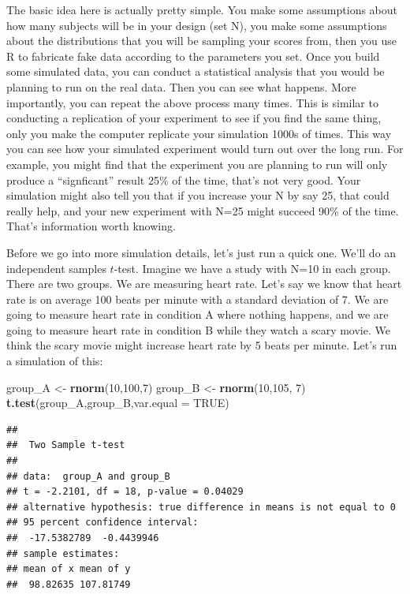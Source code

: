 \documentclass[
]{book}
\newenvironment{Shaded}{\begin{snugshade}}{\end{snugshade}}
\newcommand{\DataTypeTok}[1]{\textcolor[rgb]{0.13,0.29,0.53}{#1}}
\newcommand{\DecValTok}[1]{\textcolor[rgb]{0.00,0.00,0.81}{#1}}
\newcommand{\KeywordTok}[1]{\textcolor[rgb]{0.13,0.29,0.53}{\textbf{#1}}}
\newcommand{\NormalTok}[1]{#1}
\newcommand{\OtherTok}[1]{\textcolor[rgb]{0.56,0.35,0.01}{#1}}
\newcommand{\StringTok}[1]{\textcolor[rgb]{0.31,0.60,0.02}{#1}}
\begin{document}
The basic idea here is actually pretty simple. You make some assumptions about how many subjects will be in your design (set N), you make some assumptions about the distributions that you will be sampling your scores from, then you use R to fabricate fake data according to the parameters you set. Once you build some simulated data, you can conduct a statistical analysis that you would be planning to run on the real data. Then you can see what happens. More importantly, you can repeat the above process many times. This is similar to conducting a replication of your experiment to see if you find the same thing, only you make the computer replicate your simulation 1000s of times. This way you can see how your simulated experiment would turn out over the long run. For example, you might find that the experiment you are planning to run will only produce a ``signficant'' result 25\% of the time, that's not very good. Your simulation might also tell you that if you increase your N by say 25, that could really help, and your new experiment with N=25 might succeed 90\% of the time. That's information worth knowing.

Before we go into more simulation details, let's just run a quick one. We'll do an independent samples \(t\)-test. Imagine we have a study with N=10 in each group. There are two groups. We are measuring heart rate. Let's say we know that heart rate is on average 100 beats per minute with a standard deviation of 7. We are going to measure heart rate in condition A where nothing happens, and we are going to measure heart rate in condition B while they watch a scary movie. We think the scary movie might increase heart rate by 5 beats per minute. Let's run a simulation of this:

\begin{Shaded}
\begin{Highlighting}[]
\NormalTok{group_A <-}\StringTok{ }\KeywordTok{rnorm}\NormalTok{(}\DecValTok{10}\NormalTok{,}\DecValTok{100}\NormalTok{,}\DecValTok{7}\NormalTok{)}
\NormalTok{group_B <-}\StringTok{ }\KeywordTok{rnorm}\NormalTok{(}\DecValTok{10}\NormalTok{,}\DecValTok{105}\NormalTok{, }\DecValTok{7}\NormalTok{)}
\KeywordTok{t.test}\NormalTok{(group_A,group_B,}\DataTypeTok{var.equal =} \OtherTok{TRUE}\NormalTok{)}
\end{Highlighting}
\end{Shaded}

\begin{verbatim}
## 
## 	Two Sample t-test
## 
## data:  group_A and group_B
## t = -2.2101, df = 18, p-value = 0.04029
## alternative hypothesis: true difference in means is not equal to 0
## 95 percent confidence interval:
##  -17.5382789  -0.4439946
## sample estimates:
## mean of x mean of y 
##  98.82635 107.81749
\end{verbatim}
\end{document}
